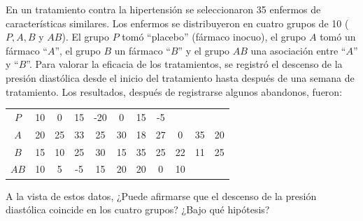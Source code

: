 \begin{ejercicio}
    En un tratamiento contra la hipertensión se seleccionaron 35 enfermos de características similares. Los enfermos se distribuyeron en cuatro grupos de 10 ($P, A, B$ y $AB$). El grupo $P$ tomó ``placebo'' (fármaco inocuo), el grupo $A$ tomó un fármaco ``$A$'', el grupo $B$ un fármaco ``$B$'' y el grupo $AB$ una asociación entre ``$A$'' y ``$B$''. Para valorar la eficacia de los tratamientos, se registró el descenso de la presión diastólica desde el inicio del tratamiento hasta después de una semana de tratamiento. Los resultados, después de registrarse algunos abandonos, fueron:
    \begin{table}[H]
    \centering
    \begin{tabular}{|c|cccccccccc|}
        \hline
        $P$ & 10 & 0 & 15 & -20 & 0 & 15 & -5 & & & \\
        $A$ & 20 & 25 & 33 & 25 & 30 & 18 & 27 & 0 & 35 & 20 \\
        $B$ & 15 & 10 & 25 & 30 & 15 & 35 & 25 & 22 & 11 & 25 \\
        $AB$ & 10 & 5 & -5 & 15 & 20 & 20 & 0 & 10 & & \\
        \hline
    \end{tabular}
    \end{table}
    \noindent
    A la vista de estos datos, ¿Puede afirmarse que el descenso de la presión diastólica coincide en los cuatro grupos? ¿Bajo qué hipótesis?
\end{ejercicio}
